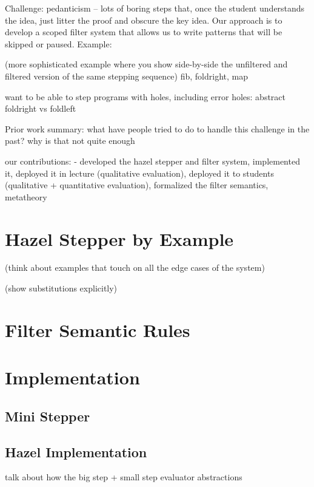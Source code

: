 
Challenge: pedanticism -- lots of boring steps that, once the student understands the idea, just litter the proof and obscure the key idea. Our approach is to develop a scoped filter system that allows us to write patterns that will be skipped or paused. Example:

(more sophisticated example where you show side-by-side the unfiltered and filtered version of the same stepping sequence)
fib, foldright, map

want to be able to step programs with holes, including error holes:
abstract foldright vs foldleft

Prior work summary: what have people tried to do to handle this challenge in the past? why is that not quite enough

our contributions:
- developed the hazel stepper and filter system, implemented it, deployed it in lecture (qualitative evaluation), deployed it to students (qualitative + quantitative evaluation), formalized the filter semantics, metatheory

\section{Hazel Stepper by Example}



(think about examples that touch on all the edge cases of the system) 

(show substitutions explicitly)

\section{Filter Semantic Rules}



\section{Implementation}

\subsection{Mini Stepper}

\subsection{Hazel Implementation}

talk about how the big step + small step evaluator abstractions

